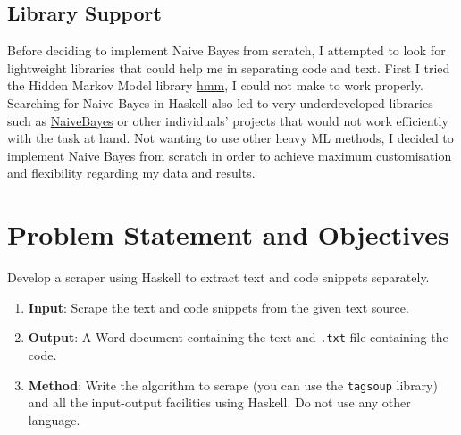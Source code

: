 \documentclass[12pt]{scrreprt}
\begin{document}
\section{Library Support}

Before deciding to implement Naive Bayes from scratch, I attempted to look for lightweight libraries that could help me in separating code and text. First I tried the Hidden Markov Model library \href{https://hackage.haskell.org/package/hmm-0.1}{hmm}, I could not make to work properly. Searching for Naive Bayes in Haskell also led to very underdeveloped libraries such as \href{https://hackage.haskell.org/package/hext-0.1.0.4/docs/NLP-Hext-NaiveBayes.html}{NaiveBayes} or other individuals' projects that would not work efficiently with the task at hand. Not wanting to use other heavy ML methods, I decided to implement Naive Bayes from scratch in order to achieve maximum customisation and flexibility regarding my data and results.


\chapter{Problem Statement and Objectives}
\begin{tcolorbox}[colback=white,colframe=gray,title={Assigned Project Statement}]
    Develop a scraper using Haskell to extract text and code snippets separately.
    \begin{enumerate}
        \item \textbf{Input}: Scrape the text and code snippets from the given text source.
        \item \textbf{Output}: A Word document containing the text and \texttt{.txt} file containing the code.
        \item \textbf{Method}: Write the algorithm to scrape (you can use the \texttt{tagsoup} library) and all the input-output facilities using Haskell. Do not use any other language.
    \end{enumerate}
\end{tcolorbox}


\end{document}
